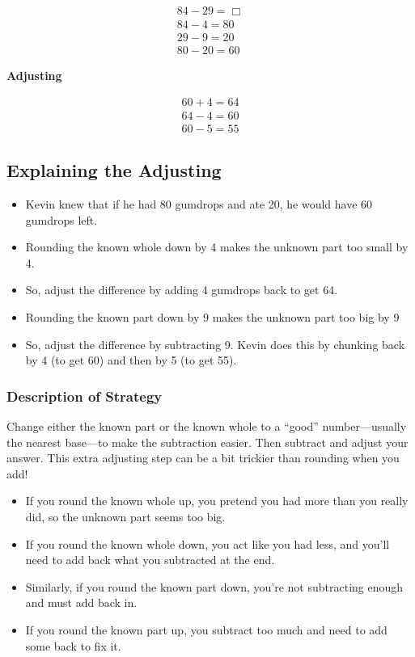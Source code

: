 \documentclass[11pt]{article}
\begin{document}
\begin{eqnarray}
84-29 = \Box\\
84-4 = 80\\
29-9 = 20\\
80-20 = 60
\end{eqnarray}


\textbf{Adjusting}

\begin{eqnarray}
60+4 = 64\\
64-4 = 60\\
60-5 = 55
\end{eqnarray}


\subsection*{Explaining the Adjusting}
\begin{itemize}
    \item Kevin knew that if he had 80 gumdrops and ate 20, he would have 60 gumdrops left.
    \item Rounding the known whole down by 4 makes the unknown part too small by 4. 
    \item So, adjust the difference by adding 4 gumdrops back to get 64.
    \item Rounding the known part down by 9 makes the unknown part too big by 9
    \item So, adjust the difference by subtracting 9. Kevin does this by chunking back by 4 (to get 60) and then by 5 (to get 55).
\end{itemize}

\subsubsection*{Description of Strategy}
Change either the known part or the known whole to a ``good'' number—usually the nearest base—to make the subtraction easier. Then subtract and adjust your answer. This extra adjusting step can be a bit trickier than rounding when you add!
\begin{itemize}
\item If you round the known whole up, you pretend you had more than you really did, so the unknown part seems too big.
\item If you round the known whole down, you act like you had less, and you'll need to add back what you subtracted at the end. 
\item Similarly, if you round the known part down, you're not subtracting enough and must add back in. 
\item If you round the known part up, you subtract too much and need to add some back to fix it.
\end{itemize}
\end{document}
